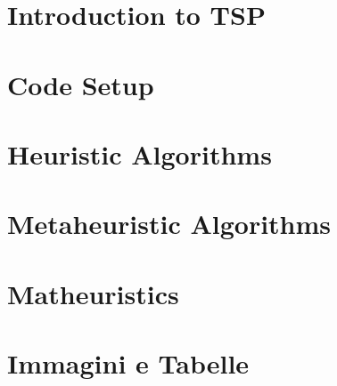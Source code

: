 \documentclass[a4paper,12pt]{book}
\begin{document}
\thispagestyle{empty} %
\cleardoublepage

\thispagestyle{empty}

\clearpage{\pagestyle{plain}\cleardoublepage}


\clearpage{\pagestyle{plain}\cleardoublepage}

\tableofcontents %

\clearpage{\pagestyle{plain}\cleardoublepage} %

\clearpage{\pagestyle{plain}\cleardoublepage} 
\chapter{Introduction to TSP} 
\label{chapter:intro} 


\clearpage{\pagestyle{plain}\cleardoublepage} 
\chapter{Code Setup} 
\label{chapter:code} 


\clearpage{\pagestyle{plain}\cleardoublepage} 
\chapter{Heuristic Algorithms} 
\label{chapter:heuristics} 
 

\clearpage{\pagestyle{plain}\cleardoublepage} 
\chapter{Metaheuristic Algorithms} 
\label{chapter:meta} 
 


\clearpage{\pagestyle{plain}\cleardoublepage} 
\chapter{Matheuristics} 
\label{chapter:matheuristics} 


\clearpage{\pagestyle{plain}\cleardoublepage}
\chapter{Immagini e Tabelle} 
\label{chapter:immagini_e_tabelle} 
 
\end{document}
